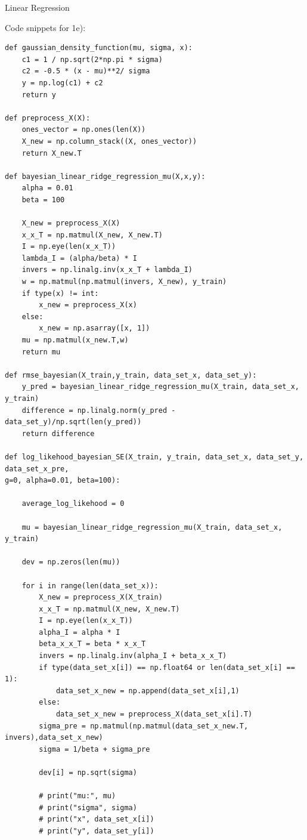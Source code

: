 \begin{task}{Linear Regression}
\begin{subtask}
\begin{enumerate}
\end{enumerate}
Code snippets for 1e):
\begin{lstlisting}
def gaussian_density_function(mu, sigma, x):
    c1 = 1 / np.sqrt(2*np.pi * sigma)
    c2 = -0.5 * (x - mu)**2/ sigma
    y = np.log(c1) + c2
    return y    

def preprocess_X(X):
    ones_vector = np.ones(len(X))
    X_new = np.column_stack((X, ones_vector))
    return X_new.T
    
def bayesian_linear_ridge_regression_mu(X,x,y):
    alpha = 0.01
    beta = 100
    
    X_new = preprocess_X(X)
    x_x_T = np.matmul(X_new, X_new.T)
    I = np.eye(len(x_x_T))
    lambda_I = (alpha/beta) * I
    invers = np.linalg.inv(x_x_T + lambda_I)
    w = np.matmul(np.matmul(invers, X_new), y_train)
    if type(x) != int:
        x_new = preprocess_X(x)
    else:
        x_new = np.asarray([x, 1])
    mu = np.matmul(x_new.T,w)
    return mu

def rmse_bayesian(X_train,y_train, data_set_x, data_set_y):
    y_pred = bayesian_linear_ridge_regression_mu(X_train, data_set_x, y_train)
    difference = np.linalg.norm(y_pred - data_set_y)/np.sqrt(len(y_pred))
    return difference
    
def log_likehood_bayesian_SE(X_train, y_train, data_set_x, data_set_y, data_set_x_pre, 
g=0, alpha=0.01, beta=100):
    
    average_log_likehood = 0
    
    mu = bayesian_linear_ridge_regression_mu(X_train, data_set_x, y_train)
    
    dev = np.zeros(len(mu))
    
    for i in range(len(data_set_x)):
        X_new = preprocess_X(X_train)
        x_x_T = np.matmul(X_new, X_new.T)
        I = np.eye(len(x_x_T))
        alpha_I = alpha * I
        beta_x_x_T = beta * x_x_T
        invers = np.linalg.inv(alpha_I + beta_x_x_T)
        if type(data_set_x[i]) == np.float64 or len(data_set_x[i] == 1):
            data_set_x_new = np.append(data_set_x[i],1)
        else:
            data_set_x_new = preprocess_X(data_set_x[i].T)
        sigma_pre = np.matmul(np.matmul(data_set_x_new.T, invers),data_set_x_new)
        sigma = 1/beta + sigma_pre
        
        dev[i] = np.sqrt(sigma)

        # print("mu:", mu)
        # print("sigma", sigma)
        # print("x", data_set_x[i])
        # print("y", data_set_y[i])
        

\end{lstlisting}
\end{subtask}
\end{task}
